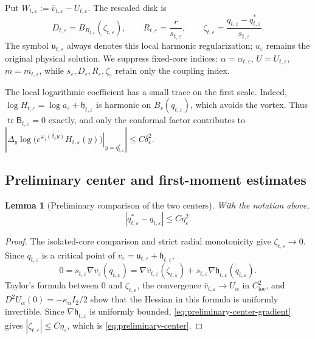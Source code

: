 \documentclass[11pt,reqno]{amsart}
\numberwithin{equation}{section}
\newtheorem{lemma}[theorem]{Lemma}
\theoremstyle{definition}
\theoremstyle{remark}
\newcommand{\eps}{\varepsilon}
\newcommand{\etae}{\eta_{\eps}}
\newcommand{\de}{\delta_{\eps}}
\newcommand{\loc}{\mathrm{loc}}
\begin{document}
Put $W_{t,\eps}:=\widehat v_{t,\eps}-U_{t,\eps}$.
The rescaled disk is
\begin{equation}\label{eq:rescaled-core-disk}
 D_{t,\eps}=B_{R_{t,\eps}}(\zeta_{t,\eps}),\qquad
 R_{t,\eps}=\frac r{s_{t,\eps}},\qquad
 \zeta_{t,\eps}=\frac{q_{t,\eps}-q_{t,\eps}^*}{s_{t,\eps}}.
\end{equation}
The symbol $\mathfrak u_{t,\eps}$ always denotes this local harmonic
regularization; $u_\eps$ remains the original physical solution.
We suppress fixed-core indices: $\alpha=\alpha_{t,\eps}$,
$U=U_{t,\eps}$, $m=m_{t,\eps}$, while
$s_\eps,D_\eps,R_\eps,\zeta_\eps$ retain only the coupling index.

The local logarithmic coefficient has a small trace on the first scale.
Indeed, $\log H_{t,\eps}=\log a_\eps+\mathfrak h_{t,\eps}$
is harmonic on $B_r(q_{t,\eps})$, which avoids the vortex.
Thus $\operatorname{tr}\mathsf B_{t,\eps}=0$ exactly, and only the
conformal factor contributes to \(
 \left|
 \left.\Delta_y\log\bigl(e^{\varphi_i(\de y)}H_{t,\eps}(y)\bigr)
 \right|_{y=q_{t,\eps}^*}
 \right|\le C\de^2.\)

\subsection{Preliminary center and first-moment estimates}
\label{app:preliminary-estimates}

\begin{lemma}[Preliminary comparison of the two centers]
\label{lem:preliminary-center}
With the notation above,
\begin{equation}
  |q_{t,\eps}^*-q_{t,\eps}|\le C\etae^2.
  \label{eq:preliminary-center}
\end{equation}
\end{lemma}

\begin{proof}
The isolated-core comparison and strict radial monotonicity give
$\zeta_{t,\eps}\to0$. Since $q_{t,\eps}$ is a critical point of
$v_\eps=\mathfrak u_{t,\eps}+\mathfrak h_{t,\eps}$,
\begin{equation}
  0={s_{t,\eps}\nabla v_\eps(q_{t,\eps})
  =\nabla\widehat v_{t,\eps}(\zeta_{t,\eps})+s_{t,\eps}\nabla\mathfrak h_{t,\eps}(q_{t,\eps}).
  \label{eq:preliminary-center-gradient}}
\end{equation}
Taylor's formula between $0$ and { $\zeta_{t,\eps}$,} the convergence
{ $\widehat v_{t,\eps}\to U_\alpha$} in $C^2_{\loc}$, and
$D^2U_\alpha(0)=-\kappa_\alpha I_2/2$ show that the Hessian in this
formula is uniformly invertible.  Since { $\nabla\mathfrak h_{t,\eps}$} is uniformly bounded,
\eqref{eq:preliminary-center-gradient} gives { $|\zeta_{t,\eps}|\le C\etae$,} which is
\eqref{eq:preliminary-center}.
\end{proof}
\end{document}
